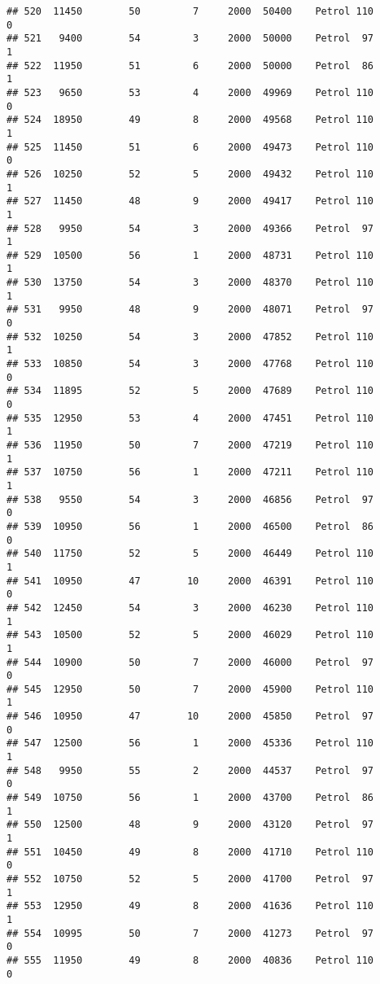 \documentclass[]{article}
\begin{document}
\begin{verbatim}
## 520  11450        50         7     2000  50400    Petrol 110         0
## 521   9400        54         3     2000  50000    Petrol  97         1
## 522  11950        51         6     2000  50000    Petrol  86         1
## 523   9650        53         4     2000  49969    Petrol 110         0
## 524  18950        49         8     2000  49568    Petrol 110         1
## 525  11450        51         6     2000  49473    Petrol 110         0
## 526  10250        52         5     2000  49432    Petrol 110         1
## 527  11450        48         9     2000  49417    Petrol 110         1
## 528   9950        54         3     2000  49366    Petrol  97         1
## 529  10500        56         1     2000  48731    Petrol 110         1
## 530  13750        54         3     2000  48370    Petrol 110         1
## 531   9950        48         9     2000  48071    Petrol  97         0
## 532  10250        54         3     2000  47852    Petrol 110         1
## 533  10850        54         3     2000  47768    Petrol 110         0
## 534  11895        52         5     2000  47689    Petrol 110         0
## 535  12950        53         4     2000  47451    Petrol 110         1
## 536  11950        50         7     2000  47219    Petrol 110         1
## 537  10750        56         1     2000  47211    Petrol 110         1
## 538   9550        54         3     2000  46856    Petrol  97         0
## 539  10950        56         1     2000  46500    Petrol  86         0
## 540  11750        52         5     2000  46449    Petrol 110         1
## 541  10950        47        10     2000  46391    Petrol 110         0
## 542  12450        54         3     2000  46230    Petrol 110         1
## 543  10500        52         5     2000  46029    Petrol 110         1
## 544  10900        50         7     2000  46000    Petrol  97         0
## 545  12950        50         7     2000  45900    Petrol 110         1
## 546  10950        47        10     2000  45850    Petrol  97         0
## 547  12500        56         1     2000  45336    Petrol 110         1
## 548   9950        55         2     2000  44537    Petrol  97         0
## 549  10750        56         1     2000  43700    Petrol  86         1
## 550  12500        48         9     2000  43120    Petrol  97         1
## 551  10450        49         8     2000  41710    Petrol 110         0
## 552  10750        52         5     2000  41700    Petrol  97         1
## 553  12950        49         8     2000  41636    Petrol 110         1
## 554  10995        50         7     2000  41273    Petrol  97         0
## 555  11950        49         8     2000  40836    Petrol 110         0

\end{verbatim}
\end{document}
